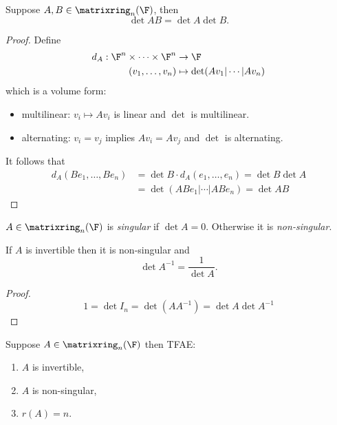 \documentclass[a4paper]{article}
\newcommand*{\M}{\matrixring}
\theoremstyle{definition}
\begin{document}
\begin{proposition}
  Suppose \(A, B \in \M_n(\F)\), then
  \[
    \det AB =\det A \det B.
  \]
\end{proposition}

\begin{proof}
  Define
  \begin{align*}
    d_A: \F^n \times \dots \times \F^n &\to \F \\
    (v_1, \dots, v_n) &\mapsto \det(Av_1|\cdots|Av_n)
  \end{align*}
  which is a volume form:
  \begin{itemize}
  \item multilinear: \(v_i \mapsto Av_i\) is linear and \(\det\) is multilinear.
  \item alternating: \(v_i = v_j\) implies \(Av_i = Av_j\) and \(\det\) is alternating.
  \end{itemize}
  It follows that
  \begin{align*}
    d_A(Be_1, \dots, Be_n) &= \det B \cdot d_A(e_1, \dots, e_n) = \det B \det A \\
                           &= \det (ABe_1| \cdots | ABe_n) = \det AB
  \end{align*}
\end{proof}

\begin{definition}[Singular]
  \(A \in \M_n(\F)\) is \emph{singular} if \(\det A = 0\). Otherwise it is \emph{non-singular}.
\end{definition}

\begin{lemma}
  If \(A\) is invertible then it is non-singular and
  \[
    \det A^{-1} = \frac{1}{\det A}.
  \]
\end{lemma}

\begin{proof}
  \[
    1 = \det I_n = \det(AA^{-1}) = \det A \det A^{-1}
  \]
\end{proof}

\begin{theorem}
  Suppose \(A \in \M_n(\F)\) then TFAE:
  \begin{enumerate}
  \item \(A\) is invertible,
  \item \(A\) is non-singular,
  \item \(r(A) = n\).
  \end{enumerate}
\end{theorem}
\end{document}
